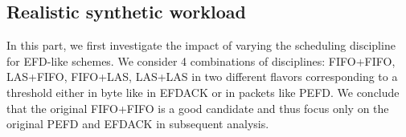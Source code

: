\documentclass[preprint,12pt]{elsarticle}
\begin{document}
%
%
%
%
%

\subsection{Realistic synthetic workload} \label{section:realistic_workload}
In this part, we first investigate the impact of varying the scheduling discipline for EFD-like schemes. We consider 4 combinations of disciplines: FIFO+FIFO, LAS+FIFO, FIFO+LAS, LAS+LAS  in two different flavors corresponding to  a threshold either in byte like in EFDACK or in  packets like PEFD. We conclude that the original FIFO+FIFO is a good candidate and thus focus only on the original PEFD and EFDACK in subsequent analysis.
\end{document}

